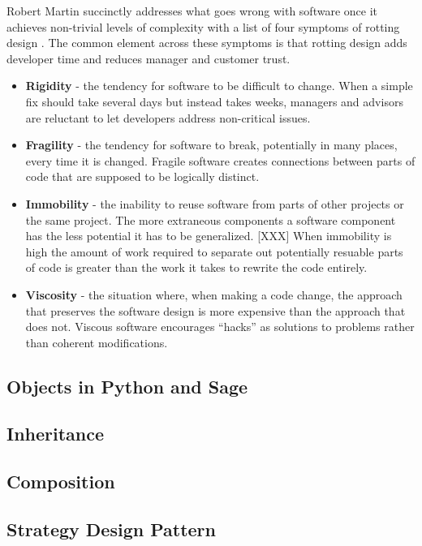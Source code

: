 Robert Martin succinctly addresses what goes wrong with software once it
achieves non-trivial levels of complexity with a list of four symptoms of
rotting design \cite{martin2000design}. The common element across these symptoms
is that rotting design adds developer time and reduces manager and customer
trust.
\begin{itemize}
\item {\bf Rigidity} - the tendency for software to be difficult to change. When
  a simple fix should take several days but instead takes weeks, managers and
  advisors are reluctant to let developers address non-critical issues.
\item {\bf Fragility} - the tendency for software to break, potentially in many
  places, every time it is changed. Fragile software creates connections between
  parts of code that are supposed to be logically distinct.
\item {\bf Immobility} - the inability to reuse software from parts of other
  projects or the same project. The more extraneous components a software
  component has the less potential it has to be generalized. [XXX] When
  immobility is high the amount of work required to separate out potentially
  resuable parts of code is greater than the work it takes to rewrite the code
  entirely.
\item {\bf Viscosity} - the situation where, when making a code change, the
  approach that preserves the software design is more expensive than the
  approach that does not. Viscous software encourages ``hacks'' as solutions to
  problems rather than coherent modifications.
\end{itemize}

\subsection{Objects in Python and Sage}

\subsection{Inheritance}

\subsection{Composition}

\subsection{Strategy Design Pattern}

